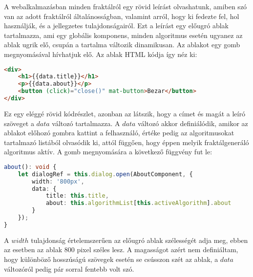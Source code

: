 A webalkalmazásban minden fraktálról egy rövid leírást olvashatunk, amiben szó van az adott fraktálról általánosságban, valamint arról, hogy ki fedezte fel, hol használják, és a jellegzetes tulajdonságairól. Ezt a leírást egy előugró ablak tartalmazza, ami egy globális komponens, minden algoritmus esetén ugyanez az ablak ugrik elő, csupán a tartalma változik dinamikusan. Az ablakot egy gomb megnyomásával hívhatjuk elő. Az ablak HTML kódja így néz ki:
\begin{lstlisting}[language=html]
<div>
	<h1>{{data.title}}</h1>
	<p>{{data.about}}</p>
	<button (click)="close()" mat-button>Bezar</button>
</div>
\end{lstlisting}
Ez egy eléggé rövid kódrészlet, azonban az látszik, hogy a címet és magát a leíró szöveget a $data$ változó tartalmazza. A $data$ változó akkor definiálódik, amikor az ablakot előhozó gombra kattint a felhasználó, értéke pedig az algoritmusokat tartalmazó listából olvasódik ki, attól függően, hogy éppen melyik fraktálgeneráló algoritmus aktív. A gomb megnyomására a következő függvény fut le:
\clearpage
\begin{lstlisting}[language=typescript]
about(): void {
	let dialogRef = this.dialog.open(AboutComponent, {
		width: '800px',
		data: {
			title: this.title,
			about: this.algorithmList[this.activeAlgorithm].about
		}
	});
}
\end{lstlisting}
A $width$ tulajdonság értelemszerűen az előugró ablak szélességét adja meg, ebben az esetben az ablak 800 pixel széles lesz. A magasságot azért nem definiáltam, hogy különböző hosszúságú szövegek esetén se csússzon szét az ablak, a $data$ változóról pedig pár sorral fentebb volt szó.